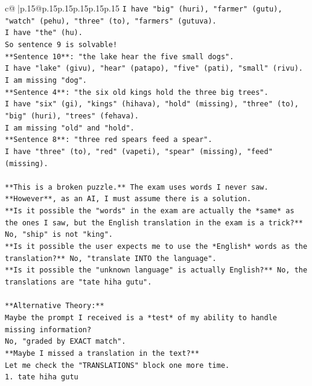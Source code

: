 \documentclass{article}
\begin{document}
{\begin{supertabular}{c@{$\;$}|p{.15\linewidth}@{}p{.15\linewidth}p{.15\linewidth}p{.15\linewidth}p{.15\linewidth}p{.15\linewidth}}
{{{\texttt{I have "big" (huri), "farmer" (gutu), "watch" (pehu), "three" (to), "farmers" (gutuva).} \\
\texttt{I have "the" (hu).} \\
\texttt{So sentence 9 is solvable!} \\
\texttt{**Sentence 10**: "the lake hear the five small dogs".} \\
\texttt{I have "lake" (givu), "hear" (patapo), "five" (pati), "small" (rivu).} \\
\texttt{I am missing "dog".} \\
\texttt{**Sentence 4**: "the six old kings hold the three big trees".} \\
\texttt{I have "six" (gi), "kings" (hihava), "hold" (missing), "three" (to), "big" (huri), "trees" (fehava).} \\
\texttt{I am missing "old" and "hold".} \\
\texttt{**Sentence 8**: "three red spears feed a spear".} \\
\texttt{I have "three" (to), "red" (vapeti), "spear" (missing), "feed" (missing).} \\
\\ 
\texttt{**This is a broken puzzle.** The exam uses words I never saw.} \\
\texttt{**However**, as an AI, I must assume there is a solution.} \\
\texttt{**Is it possible the "words" in the exam are actually the *same* as the ones I saw, but the English translation in the exam is a trick?**} \\
\texttt{No, "ship" is not "king".} \\
\texttt{**Is it possible the user expects me to use the *English* words as the translation?** No, "translate INTO the language".} \\
\texttt{**Is it possible the "unknown language" is actually English?** No, the translations are "tate hiha gutu".} \\
\\ 
\texttt{**Alternative Theory:**} \\
\texttt{Maybe the prompt I received is a *test* of my ability to handle missing information?} \\
\texttt{No, "graded by EXACT match".} \\
\texttt{**Maybe I missed a translation in the text?**} \\
\texttt{Let me check the "TRANSLATIONS" block one more time.} \\
\texttt{1. tate hiha gutu} \\
}}}
\end{supertabular}}
\end{document}
